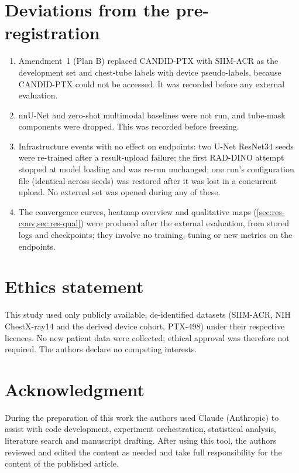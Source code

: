 \documentclass{ieeeaccess}
\begin{document}
\section*{Deviations from the pre-registration}
\begin{enumerate}
  \item Amendment~1 (Plan B) replaced CANDID-PTX with SIIM-ACR as the development set and chest-tube labels with device pseudo-labels, because CANDID-PTX could not be accessed. It was recorded before any external evaluation.
  \item nnU-Net and zero-shot multimodal baselines were not run, and tube-mask components were dropped. This was recorded before freezing.
  \item Infrastructure events with no effect on endpoints: two U-Net ResNet34 seeds were re-trained after a result-upload failure; the first RAD-DINO attempt stopped at model loading and was re-run unchanged; one run's configuration file (identical across seeds) was restored after it was lost in a concurrent upload. No external set was opened during any of these.
  \item The convergence curves, heatmap overview and qualitative maps (\cref{sec:res-conv,sec:res-qual}) were produced after the external evaluation, from stored logs and checkpoints; they involve no training, tuning or new metrics on the endpoints.
\end{enumerate}

\section*{Ethics statement}
This study used only publicly available, de-identified datasets (SIIM-ACR, NIH ChestX-ray14 and the derived device cohort, PTX-498) under their respective licences. No new patient data were collected; ethical approval was therefore not required. The authors declare no competing interests.

\section*{Acknowledgment}
During the preparation of this work the authors used Claude (Anthropic) to assist with code development, experiment orchestration, statistical analysis, literature search and manuscript drafting. After using this tool, the authors reviewed and edited the content as needed and take full responsibility for the content of the published article.



\end{document}
